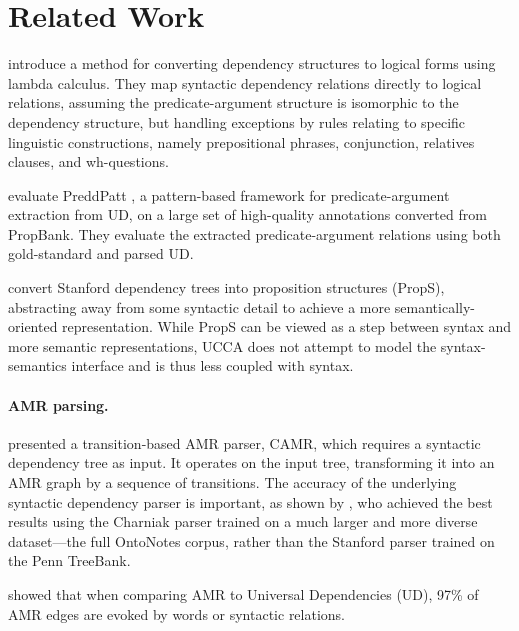 \documentclass[11pt,a4paper]{article}
\begin{document}
\section{Related Work}\label{sec:related_work}

 introduce a method for converting dependency
structures to logical forms using lambda calculus.
They map syntactic dependency relations directly to logical relations,
assuming the predicate-argument structure is isomorphic to the dependency structure,
but handling exceptions by rules relating to specific linguistic constructions,
namely prepositional phrases, conjunction, relatives clauses, and wh-questions.

 evaluate PreddPatt \cite{white2016universal},
a pattern-based framework for predicate-argument extraction from UD,
on a large set of high-quality annotations converted from PropBank.
They evaluate the extracted predicate-argument relations using both
gold-standard and parsed UD.

 convert Stanford dependency trees into
proposition structures ({\sc PropS}), abstracting away from some syntactic detail to
achieve a more semantically-oriented representation.
While {\sc PropS} can be viewed as a step between syntax and more semantic representations,
UCCA does not attempt to model
the syntax-semantics interface and is thus less coupled with syntax.

\paragraph{AMR parsing.}

presented a transition-based AMR parser, CAMR, which requires a
syntactic dependency tree as input.
It operates on the input tree, transforming it into an AMR graph
by a sequence of transitions.
The accuracy of the underlying syntactic dependency parser is important,
as shown by ,
who achieved the best results using the Charniak parser trained on a
much larger and more diverse dataset---the full OntoNotes corpus,
rather than the Stanford parser trained on the Penn TreeBank.

 showed that when comparing AMR to Universal Dependencies (UD),
97\% of AMR edges are evoked by words or syntactic relations.
\end{document}
